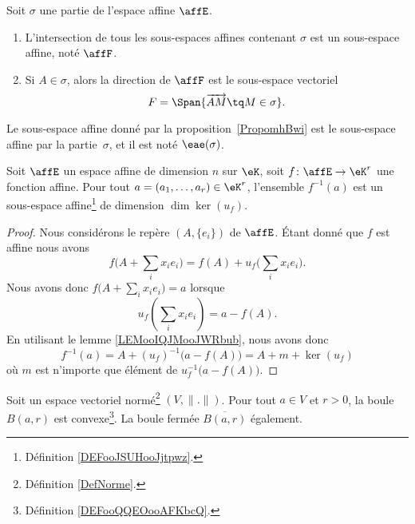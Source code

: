 \begin{proposition}      \label{PropomhBwi}
	Soit \( \sigma\) une partie de l'espace affine \( \affE\).
	\begin{enumerate}
		\item
		      L'intersection de tous les sous-espaces affines contenant \( \sigma\) est un sous-espace affine, noté \( \affF\).
		\item
		      Si \( A\in \sigma\), alors la direction de \( \affF\) est le sous-espace vectoriel
		      \begin{equation}        \label{EqnRAUfg}
			      F=\Span\{ \overrightarrow{ AM }\tq M\in \sigma \}.
		      \end{equation}
	\end{enumerate}
\end{proposition}
Le sous-espace affine donné par la proposition~\ref{PropomhBwi} est le sous-espace affine  par la partie~\( \sigma\), et il est noté \( \eae(\sigma)\). 

\begin{proposition}     \label{PROPooAKJBooMkmsiV}
	Soit \( \affE\) un espace affine de dimension \( n\) sur \( \eK\), soit \( f\colon \affE\to \eK^r\) une fonction affine. Pour tout \( a=(a_1,\ldots, a_r)\in \eK^r\), l'ensemble \( f^{-1}(a)\) est un sous-espace affine\footnote{Définition \ref{DEFooJSUHooJjtpwz}.} de dimension \( \dim\ker(u_f)\).
\end{proposition}

\begin{proof}
	Nous considérons le repère \( (A,\{ e_i \})\) de \( \affE\). Étant donné que \( f\) est affine nous avons
	\begin{equation}
		f\big( A+\sum_ix_ie_i \big)=f(A)+u_f\big( \sum_ix_ie_i \big).
	\end{equation}
	Nous avons donc \( f\big( A+\sum_ix_ie_i \big)=a\) lorsque
	\begin{equation}
		u_f(\sum_ix_ie_i)=a-f(A).
	\end{equation}
	En utilisant le lemme \ref{LEMooIQJMooJWRbub}, nous avons donc
	\begin{equation}
		f^{-1}(a)=A+(u_f)^{-1}\big( a-f(A) \big)=A+m+\ker(u_f)
	\end{equation}
	où \( m\) est n'importe que élément de \( u_f^{-1}\big(a-f(A)\big)\).
\end{proof}

\begin{proposition}     \label{PROPooUQLUooDQfYLT}
	Soit un espace vectoriel normé\footnote{Définition \ref{DefNorme}.} \( (V,\| . \|)\). Pour tout \( a\in V\) et \( r>0\), la boule \( B(a,r)\) est convexe\footnote{Définition \ref{DEFooQQEOooAFKbcQ}.}. La boule fermée \( \overline{ B(a,r) }\) également.
\end{proposition}

